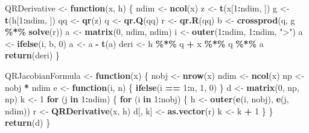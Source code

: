 \documentclass[
  12pt,
]{article}
\newenvironment{Shaded}{\begin{snugshade}}{\end{snugshade}}
\newcommand{\ControlFlowTok}[1]{\textcolor[rgb]{0.13,0.29,0.53}{\textbf{#1}}}
\newcommand{\DecValTok}[1]{\textcolor[rgb]{0.00,0.00,0.81}{#1}}
\newcommand{\FunctionTok}[1]{\textcolor[rgb]{0.13,0.29,0.53}{\textbf{#1}}}
\newcommand{\NormalTok}[1]{#1}
\newcommand{\OtherTok}[1]{\textcolor[rgb]{0.56,0.35,0.01}{#1}}
\newcommand{\SpecialCharTok}[1]{\textcolor[rgb]{0.81,0.36,0.00}{\textbf{#1}}}
\newcommand{\StringTok}[1]{\textcolor[rgb]{0.31,0.60,0.02}{#1}}
\begin{document}
\begin{Shaded}
\begin{Highlighting}[]
\NormalTok{QRDerivative }\OtherTok{\textless{}{-}} \ControlFlowTok{function}\NormalTok{(x, h) \{}
\NormalTok{  ndim }\OtherTok{\textless{}{-}} \FunctionTok{ncol}\NormalTok{(x)}
\NormalTok{  z }\OtherTok{\textless{}{-}} \FunctionTok{t}\NormalTok{(x[}\DecValTok{1}\SpecialCharTok{:}\NormalTok{ndim, ])}
\NormalTok{  g }\OtherTok{\textless{}{-}} \FunctionTok{t}\NormalTok{(h[}\DecValTok{1}\SpecialCharTok{:}\NormalTok{ndim, ])}
\NormalTok{  qq }\OtherTok{\textless{}{-}} \FunctionTok{qr}\NormalTok{(z)}
\NormalTok{  q }\OtherTok{\textless{}{-}} \FunctionTok{qr.Q}\NormalTok{(qq)}
\NormalTok{  r }\OtherTok{\textless{}{-}} \FunctionTok{qr.R}\NormalTok{(qq)}
\NormalTok{  b }\OtherTok{\textless{}{-}} \FunctionTok{crossprod}\NormalTok{(q, g }\SpecialCharTok{\%*\%} \FunctionTok{solve}\NormalTok{(r))}
\NormalTok{  a }\OtherTok{\textless{}{-}} \FunctionTok{matrix}\NormalTok{(}\DecValTok{0}\NormalTok{, ndim, ndim)}
\NormalTok{  i }\OtherTok{\textless{}{-}} \FunctionTok{outer}\NormalTok{(}\DecValTok{1}\SpecialCharTok{:}\NormalTok{ndim, }\DecValTok{1}\SpecialCharTok{:}\NormalTok{ndim, }\StringTok{"\textgreater{}"}\NormalTok{)}
\NormalTok{  a }\OtherTok{\textless{}{-}} \FunctionTok{ifelse}\NormalTok{(i, b, }\DecValTok{0}\NormalTok{)}
\NormalTok{  a }\OtherTok{\textless{}{-}}\NormalTok{ a }\SpecialCharTok{{-}} \FunctionTok{t}\NormalTok{(a)}
\NormalTok{  deri }\OtherTok{\textless{}{-}}\NormalTok{ h }\SpecialCharTok{\%*\%}\NormalTok{ q }\SpecialCharTok{+}\NormalTok{ x }\SpecialCharTok{\%*\%}\NormalTok{ q }\SpecialCharTok{\%*\%}\NormalTok{ a}
  \FunctionTok{return}\NormalTok{(deri)}
\NormalTok{\}}

\NormalTok{QRJacobianFormula }\OtherTok{\textless{}{-}} \ControlFlowTok{function}\NormalTok{(x) \{}
\NormalTok{  nobj }\OtherTok{\textless{}{-}} \FunctionTok{nrow}\NormalTok{(x)}
\NormalTok{  ndim }\OtherTok{\textless{}{-}} \FunctionTok{ncol}\NormalTok{(x)}
\NormalTok{  np }\OtherTok{\textless{}{-}}\NormalTok{ nobj }\SpecialCharTok{*}\NormalTok{ ndim}
\NormalTok{  e }\OtherTok{\textless{}{-}} \ControlFlowTok{function}\NormalTok{(i, n) \{}
    \FunctionTok{ifelse}\NormalTok{(i }\SpecialCharTok{==} \DecValTok{1}\SpecialCharTok{:}\NormalTok{n, }\DecValTok{1}\NormalTok{, }\DecValTok{0}\NormalTok{)}
\NormalTok{  \}}
\NormalTok{  d }\OtherTok{\textless{}{-}} \FunctionTok{matrix}\NormalTok{(}\DecValTok{0}\NormalTok{, np, np)}
\NormalTok{  k }\OtherTok{\textless{}{-}} \DecValTok{1}
  \ControlFlowTok{for}\NormalTok{ (j }\ControlFlowTok{in} \DecValTok{1}\SpecialCharTok{:}\NormalTok{ndim) \{}
    \ControlFlowTok{for}\NormalTok{ (i }\ControlFlowTok{in} \DecValTok{1}\SpecialCharTok{:}\NormalTok{nobj) \{}
\NormalTok{      h }\OtherTok{\textless{}{-}} \FunctionTok{outer}\NormalTok{(}\FunctionTok{e}\NormalTok{(i, nobj), }\FunctionTok{e}\NormalTok{(j, ndim))}
\NormalTok{      r }\OtherTok{\textless{}{-}} \FunctionTok{QRDerivative}\NormalTok{(x, h)}
\NormalTok{      d[, k] }\OtherTok{\textless{}{-}} \FunctionTok{as.vector}\NormalTok{(r)}
\NormalTok{      k }\OtherTok{\textless{}{-}}\NormalTok{ k }\SpecialCharTok{+} \DecValTok{1}
\NormalTok{    \}}
\NormalTok{  \}}
  \FunctionTok{return}\NormalTok{(d)}
\NormalTok{\}}


\end{Highlighting}
\end{Shaded}
\end{document}

